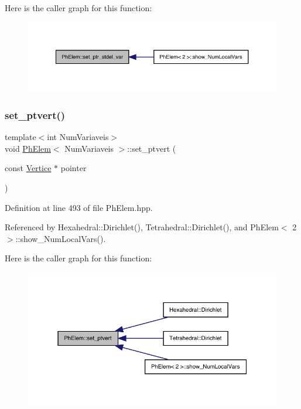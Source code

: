 Here is the caller graph for this function\+:
\nopagebreak
\begin{figure}[H]
\begin{center}
\leavevmode
\includegraphics[width=350pt]{classPhElem_a52fdbcf2283aacd8fdf9672018d74e4a_icgraph}
\end{center}
\end{figure}
\mbox{\label{classPhElem_a8ed472a9e135b1e16b962c14df8f2225}} 
\subsubsection{\texorpdfstring{set\+\_\+ptvert()}{set\_ptvert()}}
{\footnotesize\ttfamily template$<$int Num\+Variaveis$>$ \\
void \hyperlink{classPhElem}{Ph\+Elem}$<$ Num\+Variaveis $>$\+::set\+\_\+ptvert (\begin{DoxyParamCaption}\item[{const \hyperlink{structVertice}{Vertice} $\ast$}]{pointer }\end{DoxyParamCaption})}



Definition at line 493 of file Ph\+Elem.\+hpp.



Referenced by Hexahedral\+::\+Dirichlet(), Tetrahedral\+::\+Dirichlet(), and Ph\+Elem$<$ 2 $>$\+::show\+\_\+\+Num\+Local\+Vars().

Here is the caller graph for this function\+:
\nopagebreak
\begin{figure}[H]
\begin{center}
\leavevmode
\includegraphics[width=331pt]{classPhElem_a8ed472a9e135b1e16b962c14df8f2225_icgraph}
\end{center}
\end{figure}
\mbox{\label{classPhElem_a03505c861fbcdb7cf8faec9fe5eea088}} 
